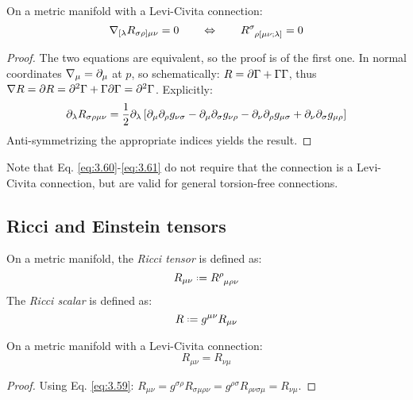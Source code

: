 \begin{theorem}[Bianchi]
  On a metric manifold with a Levi-Civita connection:
  \begin{equation}
    \na_{[\lambda} R_{\sigma \rho] \mu \nu} = 0
    \qquad \Leftrightarrow \qquad
    \tensor{R}{^\sigma_{\rho [\mu \nu ; \lambda]}} = 0
    \label{eq:3.61}
  \end{equation}
\end{theorem}
\begin{proof}
  The two equations are equivalent, so the proof is of the first one. In normal coordinates $ \nabla_\mu = \partial_\mu $ at $ p $, so schematically: $ R = \partial \Gamma + \Gamma \Gamma $, thus $ \nabla R = \partial R = \partial^2 \Gamma + \Gamma \partial \Gamma = \partial^2 \Gamma $. Explicitly:
  \begin{equation*}
    \partial_\lambda R_{\sigma \rho \mu \nu} = \frac{1}{2} \partial_\lambda \left[ \partial_\mu \partial_\rho g_{\nu \sigma} - \partial_\mu \partial_\sigma g_{\nu \rho} - \partial_\nu \partial_\rho g_{\mu \sigma} + \partial_\nu \partial_\sigma g_{\mu \rho} \right]
  \end{equation*}
  Anti-symmetrizing the appropriate indices yields the result.
\end{proof}

Note that Eq. \ref{eq:3.60}-\ref{eq:3.61} do not require that the connection is a Levi-Civita connection, but are valid for general torsion-free connections.

\subsection{Ricci and Einstein tensors}

\begin{definition}
  On a metric manifold, the \textit{Ricci tensor} is defined as:
  \begin{equation}
    R_{\mu \nu} \defeq \tensor{R}{^\rho _{\mu \rho \nu}}
    \label{eq:3.62}
  \end{equation}
  The \textit{Ricci scalar} is defined as:
  \begin{equation}
    R \defeq g^{\mu \nu} R_{\mu \nu}
    \label{eq:3.63}
  \end{equation}
\end{definition}

\begin{proposition}
  On a metric manifold with a Levi-Civita connection:
  \begin{equation}
    R_{\mu \nu} = R_{\nu \mu}
    \label{eq:3.64}
  \end{equation}
\end{proposition}
\begin{proof}
  Using Eq. \ref{eq:3.59}: $ R_{\mu \nu} = g^{\sigma \rho} R_{\sigma \mu \rho \nu} = g^{\rho \sigma} R_{\rho \nu \sigma \mu} = R_{\nu \mu} $.
\end{proof}

